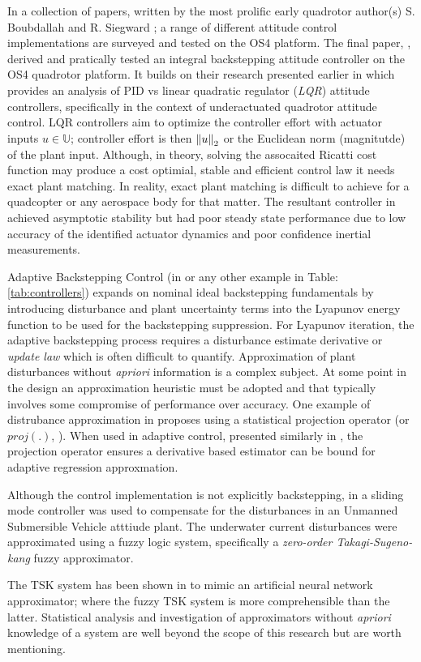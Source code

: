 \par
\vspace{-15pt}
In a collection of papers, written by the most prolific early quadrotor author(s) S. Boubdallah and R. Siegward \cite{pidlqr,indoorslidingmode, fullquadcoptercontrol}; a range of different attitude control implementations are surveyed and tested on the OS4 platform. The final paper, \cite{fullquadcoptercontrol}, derived and pratically tested an integral backstepping attitude controller on the OS4 quadrotor platform. It builds on their research presented earlier in \cite{pidlqr} which provides an analysis of PID vs linear quadratic regulator (\emph{LQR}) attitude controllers, specifically in the context of underactuated quadrotor attitude control. LQR controllers aim to optimize the controller effort with actuator inputs $u\in\mathbb{U}$; controller effort is then $\left\lVert u\right\rVert_2$ or the Euclidean norm (magnitutde) of the plant input. Although, in theory, solving the assocaited Ricatti cost function may produce a cost optimial, stable and efficient control law it needs exact plant matching. In reality, exact plant matching is difficult to achieve for a quadcopter or any aerospace body for that matter. The resultant controller in \cite{pidlqr} achieved asymptotic stability but had poor steady state performance due to low accuracy of the identified actuator dynamics and poor confidence inertial measurements.
\par
Adaptive Backstepping Control (in \cite{backstepping} or any other example in Table:\ref{tab:controllers}) expands on nominal ideal backstepping fundamentals by introducing disturbance and plant uncertainty terms into the Lyapunov energy function to be used for the backstepping suppression. For Lyapunov iteration, the adaptive backstepping process requires a disturbance estimate derivative or \emph{update law} which is often difficult to quantify. Approximation of plant disturbances without \emph{apriori} information is a complex subject. At some point in the design an approximation heuristic must be adopted and that typically involves some compromise of performance over accuracy. One example of distrubance approximation in \cite{nonlinearadaptive} proposes using a statistical projection operator (or $proj(.)$, \cite{adaptiveregulation}). When used in adaptive control, presented similarly in \cite{outputfeedback}, the projection operator ensures a derivative based estimator can be bound for adaptive regression approxmation\cite{nonlinearregression}.
\par
Although the control implementation is not explicitly backstepping, in \cite{adaptiveslidingmode} a sliding mode controller was used to compensate for the disturbances in an Unmanned Submersible Vehicle atttiude plant. The underwater current disturbances were approximated using a fuzzy logic system, specifically a \emph{zero-order Takagi-Sugeno-kang} fuzzy approximator. 
\par
The TSK system has been shown in \cite{zeroTSK} to mimic an artificial neural network approximator; where the fuzzy TSK system is more comprehensible than the latter. Statistical analysis and investigation of approximators without \emph{apriori} knowledge of a system are well beyond the scope of this research but are worth mentioning.
